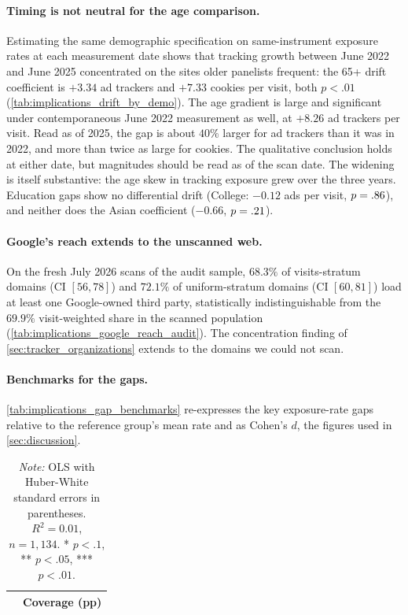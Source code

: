 \documentclass[12pt, letterpaper]{article}
\begin{document}
\paragraph{Timing is not neutral for the age comparison.}
Estimating the same demographic specification on same-instrument exposure rates at each measurement date shows that tracking growth between June 2022 and June 2025 concentrated on the sites older panelists frequent: the 65+ drift coefficient is $+3.34$ ad trackers and $+7.33$ cookies per visit, both $p < .01$ (\cref{tab:implications_drift_by_demo}).
The age gradient is large and significant under contemporaneous June 2022 measurement as well, at $+8.26$ ad trackers per visit.
Read as of 2025, the gap is about $40\%$ larger for ad trackers than it was in 2022, and more than twice as large for cookies.
The qualitative conclusion holds at either date, but magnitudes should be read as of the scan date.
The widening is itself substantive: the age skew in tracking exposure grew over the three years.
Education gaps show no differential drift (College: $-0.12$ ads per visit, $p = .86$), and neither does the Asian coefficient ($-0.66$, $p = .21$).
 
\paragraph{Google's reach extends to the unscanned web.}
On the fresh July 2026 scans of the audit sample, $68.3\%$ of visits-stratum domains (CI $[56, 78]$) and $72.1\%$ of uniform-stratum domains (CI $[60, 81]$) load at least one Google-owned third party, statistically indistinguishable from the $69.9\%$ visit-weighted share in the scanned population (\cref{tab:implications_google_reach_audit}).
The concentration finding of \cref{sec:tracker_organizations} extends to the domains we could not scan.
 
\paragraph{Benchmarks for the gaps.}
\cref{tab:implications_gap_benchmarks} re-expresses the key exposure-rate gaps relative to the reference group's mean rate and as Cohen's $d$, the figures used in \cref{sec:discussion}.
 

\begin{table}[ht]
\centering
\caption{Per-user scan coverage (percentage points) by demographics}
\label{tab:implications_coverage_by_demo}
\begin{tabular}{lr}
\toprule
& Coverage (pp) \\
\midrule

\bottomrule
\end{tabular}
\caption*{\textit{Note:} OLS with Huber-White standard errors in parentheses. $R^2 = 0.01$, $n = 1{,}134$. * $p<.1$, ** $p<.05$, *** $p<.01$.}
\end{table}
\end{document}
